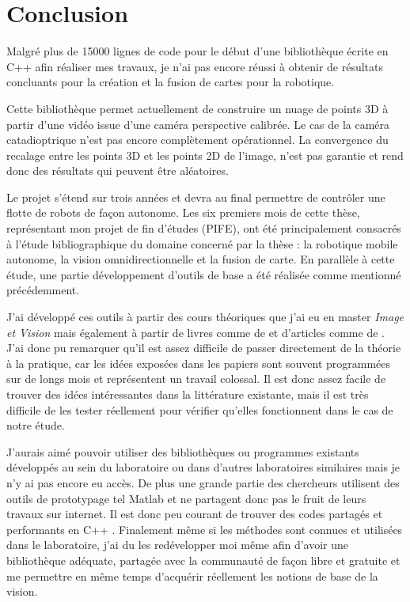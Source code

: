 \section{Conclusion}

Malgré plus de 15000 lignes de code pour le début d'une bibliothèque écrite en C++ afin réaliser mes travaux, je n'ai pas encore réussi à obtenir de résultats concluants pour la création et la fusion de cartes pour la robotique.

Cette bibliothèque permet actuellement de construire un nuage de points 3D à partir d'une vidéo issue d'une caméra perspective calibrée.
Le cas de la caméra catadioptrique n'est pas encore complètement opérationnel.
La convergence du recalage entre les points 3D et les points 2D de l'image, n'est pas garantie et rend donc des résultats qui peuvent être aléatoires.

Le projet s'étend sur trois années et devra au final permettre de contrôler une flotte de robots de façon autonome.
Les six premiers mois de cette thèse, représentant mon projet de fin d'études (PIFE), ont été principalement consacrés à l'étude bibliographique du domaine concerné par la thèse : la robotique mobile autonome, la vision omnidirectionnelle et la fusion de carte.
En parallèle à cette étude, une partie développement d'outils de base a été réalisée comme mentionné précédemment.

J'ai développé ces outils à partir des cours théoriques que j'ai eu en master \emph{Image et Vision} mais également à partir de livres comme 
 de \citeauthor{Hartley03Book} \cite{Hartley03Book} 
et d'articles comme  de \citeauthor{Puig08} \cite{Puig08}.
J'ai donc pu remarquer qu'il est assez difficile de passer directement de la théorie à la pratique, car les idées exposées dans les papiers sont souvent programmées sur de longs mois et représentent un travail colossal.
Il est donc assez facile de trouver des idées intéressantes dans la littérature existante, mais il est très difficile de les tester réellement pour vérifier qu'elles fonctionnent dans le cas de notre étude.

J'aurais aimé pouvoir utiliser des bibliothèques ou programmes existants développés au sein du laboratoire ou dans d'autres laboratoires similaires mais je n'y ai pas encore eu accès.
De plus une grande partie des chercheurs utilisent des outils de prototypage tel Matlab et ne partagent donc pas le fruit de leurs travaux sur internet.
Il est donc peu courant de trouver des codes partagés et performants en C++ .
Finalement même si les méthodes sont connues et utilisées dans le laboratoire, j'ai du les redévelopper moi même afin d'avoir une bibliothèque adéquate, partagée avec la communauté de façon libre et gratuite et me permettre en même temps d'acquérir réellement les notions de base de la vision.

